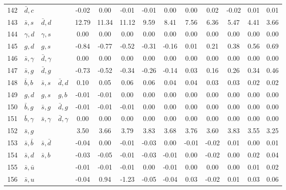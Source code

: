 \begin{tabularx}{\textwidth}{rXXX@{}S@{}S@{}S@{}S@{}S@{}S@{}S@{}S@{}S@{}S}
142 & $\bar d, c$      &                   &                  & -0.02 &  0.00 & -0.01 & -0.01 &  0.00 &  0.00 &  0.02 & -0.02 &  0.01 &  0.01 \\
143 & $\bar s, s$      & $\bar d, d$       &                  & 12.79 & 11.34 & 11.12 &  9.59 &  8.41 &  7.56 &  6.36 &  5.47 &  4.41 &  3.66 \\
144 & $\gamma, d$      & $\gamma, s$       &                  &  0.00 &  0.00 &  0.00 &  0.00 &  0.00 &  0.00 &  0.00 &  0.00 &  0.00 &  0.00 \\
145 & $g, d$           & $g, s$            &                  & -0.84 & -0.77 & -0.52 & -0.31 & -0.16 &  0.01 &  0.21 &  0.38 &  0.56 &  0.69 \\
146 & $\bar s, \gamma$ & $\bar d, \gamma$  &                  &  0.00 &  0.00 &  0.00 &  0.00 &  0.00 &  0.00 &  0.00 &  0.00 &  0.00 &  0.00 \\
147 & $\bar s, g$      & $\bar d, g$       &                  & -0.73 & -0.52 & -0.34 & -0.26 & -0.14 &  0.03 &  0.16 &  0.26 &  0.34 &  0.46 \\
148 & $\bar b,  b$     & $\bar s, s$       & $\bar d, d$      &  0.10 &  0.05 &  0.06 &  0.06 &  0.04 &  0.04 &  0.03 &  0.03 &  0.02 &  0.02 \\
149 & $g,  d$          & $g, s$            & $g, b$           & -0.01 & -0.01 &  0.00 &  0.00 &  0.00 &  0.00 &  0.00 &  0.00 &  0.00 &  0.00 \\
150 & $\bar b, g$      & $\bar s, g$       & $\bar d, g$      & -0.01 & -0.01 & -0.01 &  0.00 &  0.00 &  0.00 &  0.00 &  0.00 &  0.00 &  0.00 \\
151 & $\bar b, \gamma$ & $\bar s, \gamma$  & $\bar d, \gamma$ &  0.00 &  0.00 &  0.00 &  0.00 &  0.00 &  0.00 &  0.00 &  0.00 &  0.00 &  0.00 \\
152 & $\bar s, g$      &                   &                  &  3.50 &  3.66 &  3.79 &  3.83 &  3.68 &  3.76 &  3.60 &  3.83 &  3.55 &  3.25 \\
153 & $\bar s, \bar b$ & $\bar s, \bar d$  &                  & -0.04 &  0.00 & -0.01 & -0.03 &  0.00 & -0.01 & -0.02 &  0.01 &  0.00 &  0.01 \\
154 & $\bar s, d$      & $\bar s, b$       &                  & -0.03 & -0.05 & -0.01 & -0.03 & -0.01 &  0.00 & -0.02 &  0.00 &  0.02 &  0.04 \\
155 & $\bar s, \bar u$ &                   &                  & -0.01 & -0.01 & -0.01 &  0.00 & -0.01 &  0.00 &  0.00 &  0.00 &  0.01 &  0.02 \\
156 & $\bar s, u$      &                   &                  & -0.04 &  0.94 & -1.23 & -0.05 & -0.04 &  0.03 & -0.02 &  0.01 &  0.03 &  0.06 \\

\end{tabularx}
